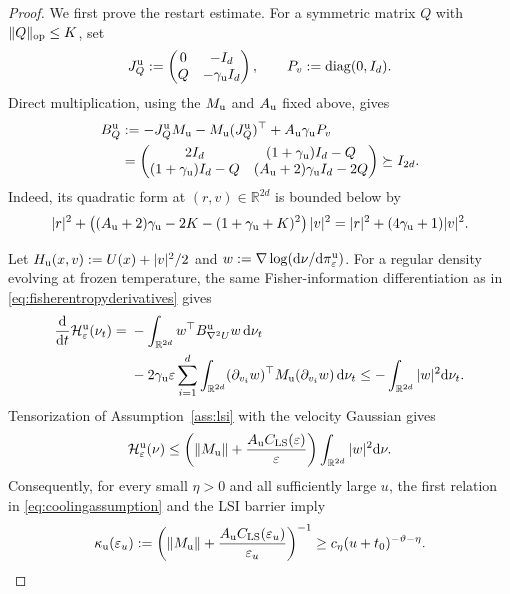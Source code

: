 \documentclass[11pt]{article}
\theoremstyle{definition}
\newcommand{\R}{\mathbb R}
\newcommand{\dd}{\mathrm d}
\newcommand{\Id}{I}
\newcommand{\cH}{\mathcal H}
\newcommand{\eps}{\varepsilon}
\begin{document}
\begin{proof}
We first prove the restart estimate. For a symmetric matrix $Q$ with
$\|Q\|_{\rm op}\leq K$, set
\[
 J_Q^{\rm u}:=
 \begin{pmatrix}0&-\Id_d\\Q&-\gamma_{\rm u}\Id_d\end{pmatrix},
 \qquad P_v:=\operatorname{diag}(0,\Id_d).
\]
Direct multiplication, using the $M_{\rm u}$ and $A_{\rm u}$ fixed above,
gives
\begin{align}\label{eq:uldcertificate}
 B_Q^{\rm u}
 &:=-J_Q^{\rm u}M_{\rm u}
       -M_{\rm u}(J_Q^{\rm u})^\top
       +A_{\rm u}\gamma_{\rm u}P_v\notag\\
 &=
 \begin{pmatrix}
 2\Id_d&(1+\gamma_{\rm u})\Id_d-Q\\
 (1+\gamma_{\rm u})\Id_d-Q&
 (A_{\rm u}+2)\gamma_{\rm u}\Id_d-2Q
 \end{pmatrix}\succeq\Id_{2d}.
\end{align}
Indeed, its quadratic form at $(r,v)\in\R^{2d}$ is bounded below by
\[
 |r|^2+
 \left((A_{\rm u}+2)\gamma_{\rm u}-2K
       -(1+\gamma_{\rm u}+K)^2\right)|v|^2
 =|r|^2+(4\gamma_{\rm u}+1)|v|^2.
\]

Let $H_{\rm u}(x,v):=U(x)+|v|^2/2$ and
$w:=\nabla\log(\dd\nu/\dd\pi^{\rm u}_\eps)$. For a regular density evolving
at frozen temperature, the same Fisher-information differentiation as in
\eqref{eq:fisherentropyderivatives} gives
\begin{align}\label{eq:uldfrozendissipation}
 \frac{\dd}{\dd t}\cH^{\rm u}_\eps(\nu_t)
 ={}&-\int_{\R^{2d}}w^\top B_{\nabla^2U}^{\rm u}w\,\dd\nu_t\notag\\
 &-2\gamma_{\rm u}\eps\sum_{i=1}^d
   \int_{\R^{2d}}(\partial_{v_i}w)^\top
       M_{\rm u}(\partial_{v_i}w)\,\dd\nu_t
 \leq-\int_{\R^{2d}}|w|^2\dd\nu_t .
\end{align}
Tensorization of Assumption~\ref{ass:lsi} with the velocity Gaussian gives
\[
 \cH^{\rm u}_\eps(\nu)
 \leq\left(\|M_{\rm u}\|
       +\frac{A_{\rm u}C_{\rm LS}(\eps)}{\eps}\right)
       \int_{\R^{2d}}|w|^2\dd\nu.
\]
Consequently, for every small $\eta>0$ and all sufficiently large $u$,
the first relation in \eqref{eq:coolingassumption} and the LSI barrier imply
\begin{equation}\label{eq:uldkappalower}
 \kappa_{\rm u}(\eps_u):=
 \left(\|M_{\rm u}\|
       +\frac{A_{\rm u}C_{\rm LS}(\eps_u)}{\eps_u}\right)^{-1}
 \geq c_\eta(u+t_0)^{-\vartheta-\eta}.
\end{equation}


\end{proof}
\end{document}
